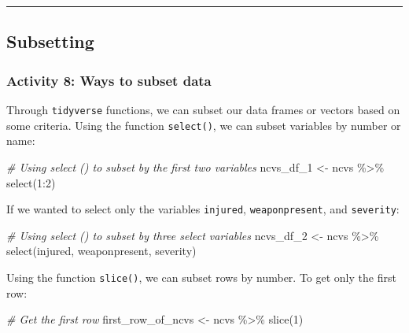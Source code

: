 \documentclass[
]{book}
\newenvironment{Shaded}{\begin{snugshade}}{\end{snugshade}}
\newcommand{\CommentTok}[1]{\textcolor[rgb]{0.56,0.35,0.01}{\textit{#1}}}
\newcommand{\DecValTok}[1]{\textcolor[rgb]{0.00,0.00,0.81}{#1}}
\newcommand{\FunctionTok}[1]{\textcolor[rgb]{0.00,0.00,0.00}{#1}}
\newcommand{\NormalTok}[1]{#1}
\newcommand{\OtherTok}[1]{\textcolor[rgb]{0.56,0.35,0.01}{#1}}
\newcommand{\SpecialCharTok}[1]{\textcolor[rgb]{0.00,0.00,0.00}{#1}}
\begin{document}
\begin{center}\rule{0.5\linewidth}{0.5pt}\end{center}

\hypertarget{subsetting}{%
\subsection{Subsetting}\label{subsetting}}

\hypertarget{activity-8-ways-to-subset-data}{%
\subsubsection{Activity 8: Ways to subset data}\label{activity-8-ways-to-subset-data}}

Through \texttt{tidyverse} functions, we can subset our data frames or vectors based on some criteria. Using the function \texttt{select()}, we can subset variables by number or name:

\begin{Shaded}
\begin{Highlighting}[]
\CommentTok{\# Using select () to subset by the first two variables}
\NormalTok{ncvs\_df\_1 }\OtherTok{\textless{}{-}}\NormalTok{ ncvs }\SpecialCharTok{\%\textgreater{}\%} \FunctionTok{select}\NormalTok{(}\DecValTok{1}\SpecialCharTok{:}\DecValTok{2}\NormalTok{) }
\end{Highlighting}
\end{Shaded}

If we wanted to select only the variables \texttt{injured}, \texttt{weaponpresent}, and \texttt{severity}:

\begin{Shaded}
\begin{Highlighting}[]
\CommentTok{\# Using select () to subset by three select variables}
\NormalTok{ncvs\_df\_2 }\OtherTok{\textless{}{-}}\NormalTok{ ncvs }\SpecialCharTok{\%\textgreater{}\%} \FunctionTok{select}\NormalTok{(injured, weaponpresent, severity) }
\end{Highlighting}
\end{Shaded}

Using the function \texttt{slice()}, we can subset rows by number. To get only the first row:

\begin{Shaded}
\begin{Highlighting}[]
\CommentTok{\# Get the first row}
\NormalTok{first\_row\_of\_ncvs }\OtherTok{\textless{}{-}}\NormalTok{ ncvs }\SpecialCharTok{\%\textgreater{}\%} \FunctionTok{slice}\NormalTok{(}\DecValTok{1}\NormalTok{) }
\end{Highlighting}
\end{Shaded}
\end{document}
